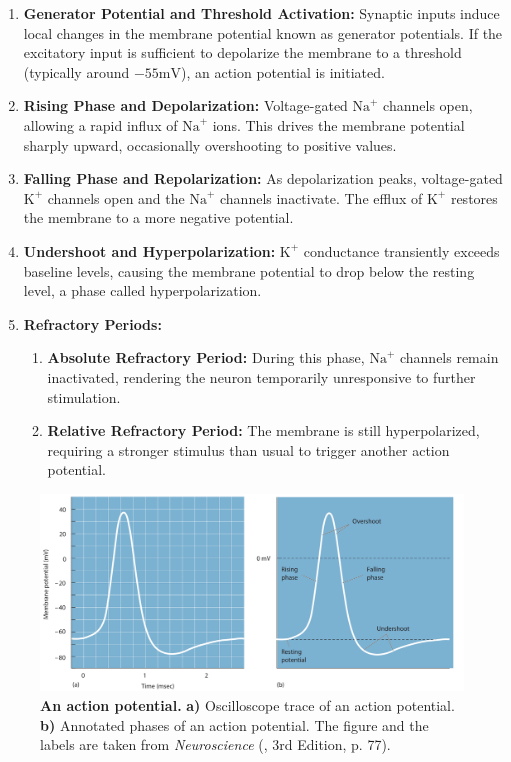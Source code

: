 \begin{enumerate}
    \item \textbf{Generator Potential and Threshold Activation:} Synaptic inputs induce local changes in the membrane potential known as generator potentials. If the excitatory input is sufficient to depolarize the membrane to a threshold (typically around $-55 \text{mV}$), an action potential is initiated.
    
    \item \textbf{Rising Phase and Depolarization:} Voltage-gated $\text{Na}^{+}$ channels open, allowing a rapid influx of $\text{Na}^{+}$ ions. This drives the membrane potential sharply upward, occasionally overshooting to positive values.
    
    \item \textbf{Falling Phase and Repolarization:} As depolarization peaks, voltage-gated $\text{K}^{+}$ channels open and the $\text{Na}^{+}$ channels inactivate. The efflux of $\text{K}^{+}$ restores the membrane to a more negative potential.
    
    \item \textbf{Undershoot and Hyperpolarization:} $\text{K}^{+}$ conductance transiently exceeds baseline levels, causing the membrane potential to drop below the resting level, a phase called hyperpolarization.

    \item \textbf{Refractory Periods:}
    \begin{enumerate}
        \item \textbf{Absolute Refractory Period:} During this phase, $\text{Na}^{+}$ channels remain inactivated, rendering the neuron temporarily unresponsive to further stimulation.
        \item \textbf{Relative Refractory Period:} The membrane is still hyperpolarized, requiring a stronger stimulus than usual to trigger another action potential.
    \end{enumerate}
\end{enumerate}

\begin{figure}
    \centering
    \includegraphics[width=\linewidth]{img/action_potential.pdf}
    \caption{\textbf{An action potential.} \textbf{a)} Oscilloscope trace of an action potential. \textbf{b)} Annotated phases of an action potential. The figure and the labels are taken from \emph{Neuroscience} (\citet{bear2020neuroscience}, 3rd Edition, p. 77).}
    \label{fig:action_potential}
\end{figure}

